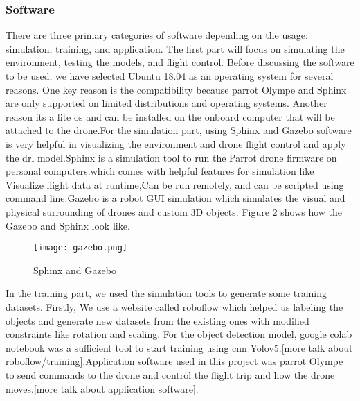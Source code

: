\documentclass[../main.tex]{subfiles}
\begin{document}
\subsubsection{Software}
There are three primary categories of software depending on the usage: simulation, training, and application. The first part will focus on simulating the environment, testing the models, and flight control. Before discussing the software to be used, we have selected Ubuntu 18.04 as an operating system for several reasons. One key reason is the compatibility because parrot Olympe and Sphinx are only supported on limited distributions and operating systems. Another reason its a lite os and can be installed on the onboard computer that will be attached to the drone.For the simulation part, using Sphinx and Gazebo software is very helpful in visualizing the environment and drone flight control and apply the \gls{drl} model.Sphinx is a simulation tool to run the Parrot drone firmware on personal computers.which comes with helpful features for simulation like Visualize flight data at runtime,Can be run remotely, and can be scripted using command line.Gazebo is a robot GUI simulation which simulates the visual and physical surrounding of drones and custom 3D objects. Figure 2 shows how the Gazebo and Sphinx look like.  \begin{figure}[H]
	\centering
	\texttt{[image: gazebo.png]}
	\caption{Sphinx and Gazebo }\label{fig2:gazebo}
\end{figure}
In the training part, we used the simulation tools to generate some training datasets. Firstly, We use a website called roboflow which helped us labeling the objects and generate new datasets from the existing ones with modified constraints like rotation and scaling. For the object detection model, google colab notebook was a sufficient tool to start training using \gls{cnn} Yolov5.[more talk about roboflow/training].Application software used in this project was parrot Olympe to send commands to the drone and control the flight trip and how the drone moves.[more talk about application software].
\end{document}
